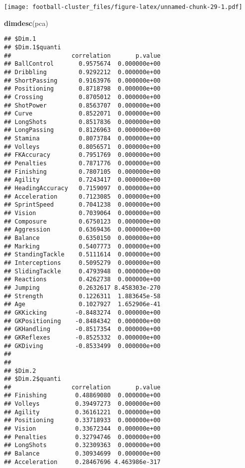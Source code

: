\documentclass[]{article}
\newenvironment{Shaded}{\begin{snugshade}}{\end{snugshade}}
\newcommand{\KeywordTok}[1]{\textcolor[rgb]{0.13,0.29,0.53}{\textbf{#1}}}
\newcommand{\NormalTok}[1]{#1}
\begin{document}
\texttt{[image: football-cluster\_files/figure-latex/unnamed-chunk-29-1.pdf]}

\begin{Shaded}
\begin{Highlighting}[]
\KeywordTok{dimdesc}\NormalTok{(pca)}
\end{Highlighting}
\end{Shaded}

\begin{verbatim}
## $Dim.1
## $Dim.1$quanti
##                 correlation       p.value
## BallControl       0.9575674  0.000000e+00
## Dribbling         0.9292212  0.000000e+00
## ShortPassing      0.9163976  0.000000e+00
## Positioning       0.8718798  0.000000e+00
## Crossing          0.8705012  0.000000e+00
## ShotPower         0.8563707  0.000000e+00
## Curve             0.8522071  0.000000e+00
## LongShots         0.8517836  0.000000e+00
## LongPassing       0.8126963  0.000000e+00
## Stamina           0.8073784  0.000000e+00
## Volleys           0.8056571  0.000000e+00
## FKAccuracy        0.7951769  0.000000e+00
## Penalties         0.7871776  0.000000e+00
## Finishing         0.7807105  0.000000e+00
## Agility           0.7243417  0.000000e+00
## HeadingAccuracy   0.7159097  0.000000e+00
## Acceleration      0.7123085  0.000000e+00
## SprintSpeed       0.7041238  0.000000e+00
## Vision            0.7039064  0.000000e+00
## Composure         0.6750123  0.000000e+00
## Aggression        0.6369436  0.000000e+00
## Balance           0.6350150  0.000000e+00
## Marking           0.5407773  0.000000e+00
## StandingTackle    0.5111614  0.000000e+00
## Interceptions     0.5095279  0.000000e+00
## SlidingTackle     0.4793948  0.000000e+00
## Reactions         0.4262738  0.000000e+00
## Jumping           0.2632617 8.458303e-270
## Strength          0.1226311  1.883645e-58
## Age               0.1027927  1.652906e-41
## GKKicking        -0.8483274  0.000000e+00
## GKPositioning    -0.8484342  0.000000e+00
## GKHandling       -0.8517354  0.000000e+00
## GKReflexes       -0.8525332  0.000000e+00
## GKDiving         -0.8533499  0.000000e+00
## 
## 
## $Dim.2
## $Dim.2$quanti
##                 correlation       p.value
## Finishing        0.48869080  0.000000e+00
## Volleys          0.39497273  0.000000e+00
## Agility          0.36161221  0.000000e+00
## Positioning      0.33718933  0.000000e+00
## Vision           0.33672344  0.000000e+00
## Penalties        0.32794746  0.000000e+00
## LongShots        0.32309363  0.000000e+00
## Balance          0.30934699  0.000000e+00
## Acceleration     0.28467696 4.463986e-317

\end{verbatim}
\end{document}
